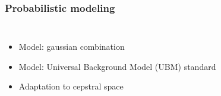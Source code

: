 \documentclass[11pt,english]{beamer}
\begin{document}
\begin{frame}
  \frametitle{Probabilistic modeling}
  \begin{columns}
    \begin{itemize}
    \item Model: gaussian combination
    \item Model: Universal Background Model (UBM) standard
    \item<2> Adaptation to cepstral space
    \end{itemize}
  \end{columns}
\end{frame}
\end{document}
